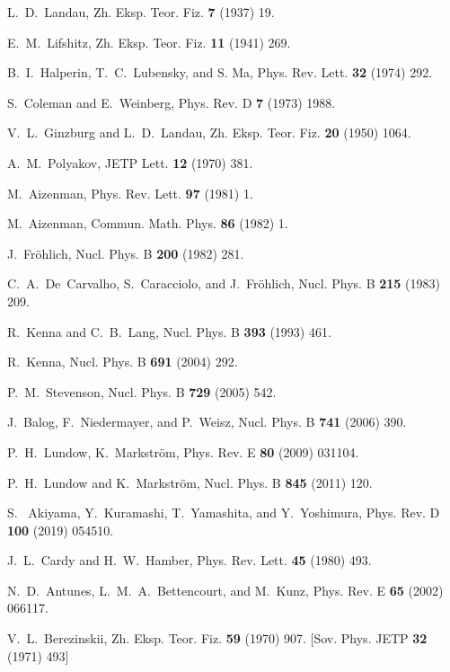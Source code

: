 \documentclass[final,twocolumn]{elsarticle}
\begin{document}
\begin{thebibliography}{00}
\small

 L.~D.~Landau, Zh. Eksp. Teor. Fiz. {\bf7} (1937) 19.

 E.~M.~Lifshitz, Zh. Eksp. Teor. Fiz. {\bf11} (1941) 269.

 B.~I.~Halperin, T.~C.~Lubensky, and S. Ma, Phys. Rev. Lett. {\bf 32} (1974) 292.

 S.~Coleman and E.~Weinberg, Phys. Rev. D {\bf7} (1973) 1988.

 V.~L.~Ginzburg and L.~D.~Landau, Zh. Eksp. Teor. Fiz. {\bf20} (1950) 1064.

 A.~M.~Polyakov, JETP Lett. {\bf12} (1970) 381.

 M.~Aizenman, Phys. Rev. Lett. {\bf97} (1981) 1.

 M.~Aizenman, Commun. Math. Phys. {\bf86} (1982) 1.

 J.~Fr\"ohlich, Nucl. Phys. B {\bf200} (1982) 281.

 C.~A.~De~Carvalho, S.~Caracciolo, and J.~Fr\"ohlich, Nucl. Phys. B {\bf215} (1983) 209.

 R.~Kenna and C.~B.~Lang, Nucl. Phys. B {\bf393} (1993) 461.

 R.~Kenna, Nucl. Phys. B {\bf691} (2004) 292.

 P.~M.~Stevenson, Nucl. Phys. B {\bf 729} (2005) 542.

 J.~Balog, F.~Niedermayer, and P.~Weisz, Nucl. Phys. B {\bf741} (2006) 390.

 P.~H.~Lundow, K.~Markstr\"om, Phys. Rev. E {\bf80} (2009) 031104.

 P.~H.~Lundow and K.~Markstr\"om, Nucl. Phys. B {\bf845} (2011) 120.

 S.~ Akiyama, Y.~Kuramashi, T.~Yamashita, and Y.~Yoshimura, Phys. Rev. D {\bf100} (2019) 054510.

 J.~L.~Cardy and H.~W.~Hamber, Phys. Rev. Lett. {\bf45} (1980) 493.

 N.~D.~Antunes, L.~M.~A.~Bettencourt, and M.~Kunz, Phys. Rev. E {\bf65} (2002) 066117.

 V.~L.~Berezinskii, Zh. Eksp. Teor. Fiz. {\bf59} (1970) 907. [Sov. Phys. JETP {\bf32} (1971) 493]


\end{thebibliography}
\end{document}
